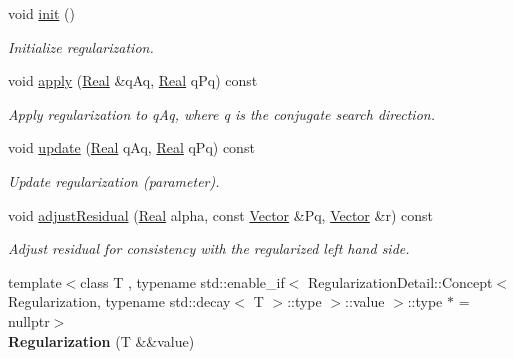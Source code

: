\begin{DoxyCompactItemize}
\item 
\hypertarget{classSpacy_1_1CG_1_1Regularization_a0a92edab4bf50bd27bc549311c736cd5}{void \hyperlink{classSpacy_1_1CG_1_1Regularization_a0a92edab4bf50bd27bc549311c736cd5}{init} ()}\label{classSpacy_1_1CG_1_1Regularization_a0a92edab4bf50bd27bc549311c736cd5}

\begin{DoxyCompactList}\small\item\em Initialize regularization. \end{DoxyCompactList}\item 
void \hyperlink{classSpacy_1_1CG_1_1Regularization_ab55da1e68e5f25b89aa3713b95d254bd}{apply} (\hyperlink{classSpacy_1_1Real}{Real} \&q\-Aq, \hyperlink{classSpacy_1_1Real}{Real} q\-Pq) const 
\begin{DoxyCompactList}\small\item\em Apply regularization to q\-Aq, where q is the conjugate search direction. \end{DoxyCompactList}\item 
void \hyperlink{classSpacy_1_1CG_1_1Regularization_aa613081282b9d2d793331b4cdc299747}{update} (\hyperlink{classSpacy_1_1Real}{Real} q\-Aq, \hyperlink{classSpacy_1_1Real}{Real} q\-Pq) const 
\begin{DoxyCompactList}\small\item\em Update regularization (parameter). \end{DoxyCompactList}\item 
void \hyperlink{classSpacy_1_1CG_1_1Regularization_a1e7aef0bb066f3e07022141de223b606}{adjust\-Residual} (\hyperlink{classSpacy_1_1Real}{Real} alpha, const \hyperlink{classSpacy_1_1Vector}{Vector} \&Pq, \hyperlink{classSpacy_1_1Vector}{Vector} \&r) const 
\begin{DoxyCompactList}\small\item\em Adjust residual for consistency with the regularized left hand side. \end{DoxyCompactList}\item 
\hypertarget{classSpacy_1_1CG_1_1Regularization_a7758d476b09bbaa7ad7aa2acf010085f}{{\footnotesize template$<$class T , typename std\-::enable\-\_\-if$<$ Regularization\-Detail\-::\-Concept$<$ Regularization, typename std\-::decay$<$ T $>$\-::type $>$\-::value $>$\-::type $\ast$  = nullptr$>$ }\\{\bfseries Regularization} (T \&\&value)}\label{classSpacy_1_1CG_1_1Regularization_a7758d476b09bbaa7ad7aa2acf010085f}


\end{DoxyCompactItemize}
